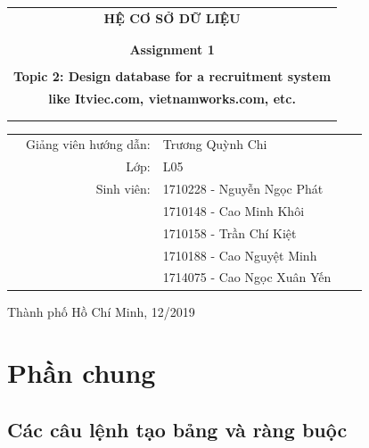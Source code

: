 \documentclass[a4paper]{article}
\begin{document}
\begin{titlepage}
	\begin{center}
		\begin{tabular}{c}
			\multicolumn{1}{c}{\textbf{{\Huge HỆ CƠ SỞ DỮ LIỆU}}}\\
			\\ \hline \\
			\textbf{{\Large Assignment 1}}\\
			\\
			\textbf{{\large Topic 2: Design database for a recruitment system }}\\
			\textbf{{\large like Itviec.com, vietnamworks.com, etc. }}\\
			\\ \hline \\
		\end{tabular}
	\end{center}
	\begin{table}[h]
		\begin{tabular}{rrlrr}
			\hspace{5cm} 
			& {\large Giảng viên hướng dẫn}: & {\large Trương Quỳnh Chi} & & \\
			& {\large Lớp}: & {\large L05} & & \\
			& {\large Sinh viên}: & {\large 1710228 - Nguyễn Ngọc Phát } \\
			& {} & {\large 1710148 - Cao Minh Khôi } \\
			& {} & {\large 1710158 - Trần Chí Kiệt } \\
			& {} & {\large 1710188 - Cao Nguyệt Minh} \\
			& {} & {\large 1714075 - Cao Ngọc Xuân Yến} \\
		\end{tabular}
	\end{table}
	
	\vspace{3cm}
	
	\begin{center}
		{\footnotesize Thành phố Hồ Chí Minh, 12/2019}
	\end{center}
	
\end{titlepage}
	
	
	\newpage
	\tableofcontents
	\newpage

	\section{Phần chung}
	\subsection{Các câu lệnh tạo bảng và ràng buộc}
\end{document}
